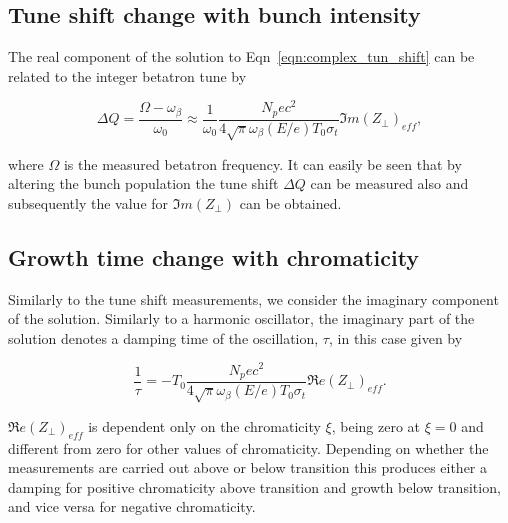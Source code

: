\subsection{Tune shift change with bunch intensity}
\label{sec:tune-shift-bunch-int}

The real component of the solution to Eqn~\ref{eqn:complex_tun_shift} can be related to the integer betatron tune by

\begin{equation}
\Delta Q = \frac{\Omega - \omega_{\beta}}{\omega_{0}} \approx \frac{1}{\omega_{0}} \frac{N_{p}ec^{2}}{4\sqrt{\pi}\omega_{\beta} \left( E/e \right)T_{0}\sigma_{t}} \Im{}m\left(  Z_{\perp} \right)_{eff},
\end{equation} 

where $\Omega$ is the measured betatron frequency. It can easily be seen that by altering the bunch population the tune shift $\Delta Q$ can be measured also and subsequently the value for $\Im{}m\left(  Z_{\perp} \right)$ can be obtained.

\subsection{Growth time change with chromaticity}
\label{sec:growth-time-chrom}

Similarly to the tune shift measurements, we consider the imaginary component of the solution. Similarly to a harmonic oscillator, the imaginary part of the solution denotes a damping time of the oscillation, $\tau$, in this case given by

\begin{equation}
\frac{1}{\tau} = -T_{0} \frac{N_{p}ec^{2}}{4\sqrt{\pi}\omega_{\beta} \left( E/e \right)T_{0}\sigma_{t}} \Re{}e\left(  Z_{\perp} \right)_{eff}.
\end{equation}

$\Re{}e\left(  Z_{\perp} \right)_{eff}$ is dependent only on the chromaticity $\xi$, being zero at $\xi = 0$ and different from zero for other values of chromaticity. Depending on whether the measurements are carried out above or below transition this produces either a damping for positive chromaticity above transition and growth below transition, and vice versa for negative chromaticity.